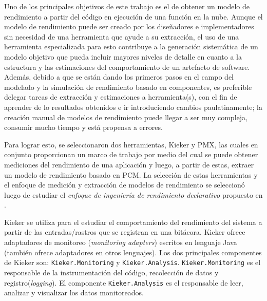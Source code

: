 Uno de los principales objetivos de este trabajo es el de obtener un modelo de rendimiento a partir 
del código en ejecución de una función en la nube. Aunque el modelo de rendimiento puede ser creado por los diseñadores e implementadores sin necesidad de una herramienta que ayude a su extracción, el uso de una herramienta especializada para esto contribuye a la generación sistemática de un modelo objetivo que pueda incluir mayores niveles de detalle en cuanto a la estructura y las estimaciones del comportamiento de un artefacto de software. Además, debido a que se están dando los primeros pasos en el campo del modelado y la simulación de rendimiento basado en componentes, es preferible delegar tareas de extracción y estimaciones a herramienta(s), con el fin de aprender de lo resultados obtenidos e ir introduciendo cambios paulatinamente; la creación manual de modelos de rendimiento puede llegar a ser muy compleja, consumir mucho tiempo y está propensa a errores. 

Para lograr esto, se seleccionaron dos herramientas, Kieker y PMX, las cuales en conjunto proporcionan un marco de trabajo por medio del cual se puede obtener mediciones del rendimiento de una aplicación y luego, a partir de estas, extraer un modelo de rendimiento basado en PCM. La selección de estas herramientas y el enfoque de medición y extracción de modelos de rendimiento se seleccionó luego de estudiar el \emph{enfoque de ingeniería de rendimiento declarativo} propuesto en \cite{Walter:2018:TDP:3185768.3185777}.



Kieker se utiliza para el estudiar el comportamiento del rendimiento del sistema a partir de las entradas/rastros que se registran en una bitácora. Kieker ofrece adaptadores de monitoreo (\emph{monitoring adapters}) escritos en lenguaje Java (también ofrece adaptadores en otros lenguajes). Los dos principales componentes de Kieker son: \texttt{Kieker.Monitoring} y \texttt{Kieker.Analysis}. \texttt{Kieker.Monitoring} es el responsable de la instrumentación del código, recolección de datos y registro(\emph{logging}). El componente \texttt{Kieker.Analysis} es el responsable de leer, analizar y visualizar los datos monitoreados.

